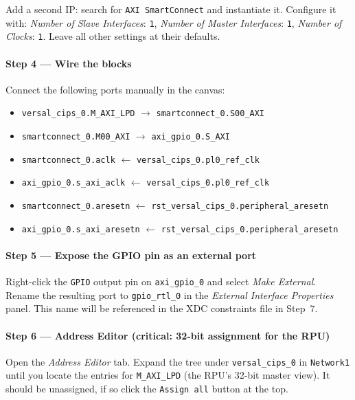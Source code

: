 \documentclass[
	a4paper,
]{CSMakotoTechnicalReport}
\begin{document}
Add a second IP: search for \texttt{AXI SmartConnect} and instantiate it.
Configure it with:
\textit{Number of Slave Interfaces}: \texttt{1},
\textit{Number of Master Interfaces}: \texttt{1},
\textit{Number of Clocks}: \texttt{1}.
Leave all other settings at their defaults.


\paragraph*{Step 4 --- Wire the blocks}

Connect the following ports manually in the canvas:

\begin{itemize}
    \item \texttt{versal\_cips\_0.M\_AXI\_LPD} $\to$ \texttt{smartconnect\_0.S00\_AXI}
    \item \texttt{smartconnect\_0.M00\_AXI} $\to$ \texttt{axi\_gpio\_0.S\_AXI}
    \item \texttt{smartconnect\_0.aclk} $\leftarrow$ \texttt{versal\_cips\_0.pl0\_ref\_clk}
    \item \texttt{axi\_gpio\_0.s\_axi\_aclk} $\leftarrow$ \texttt{versal\_cips\_0.pl0\_ref\_clk}
    \item \texttt{smartconnect\_0.aresetn} $\leftarrow$ \texttt{rst\_versal\_cips\_0.peripheral\_aresetn}
    \item \texttt{axi\_gpio\_0.s\_axi\_aresetn} $\leftarrow$ \texttt{rst\_versal\_cips\_0.peripheral\_aresetn}
\end{itemize}

\paragraph*{Step 5 --- Expose the GPIO pin as an external port}

Right-click the \texttt{GPIO} output pin on \texttt{axi\_gpio\_0} and select \textit{Make External}.
Rename the resulting port to \texttt{gpio\_rtl\_0} in the \textit{External Interface Properties} panel.
This name will be referenced in the XDC constraints file in Step~7.

\paragraph*{Step 6 --- Address Editor (critical: 32-bit assignment for the RPU)}

Open the \textit{Address Editor} tab.
Expand the tree under \texttt{versal\_cips\_0} in \texttt{Network1} until you locate the entries for \texttt{M\_AXI\_LPD} (the RPU's 32-bit master view).
It should be unassigned, if so click the \texttt{Assign all} button at the top.
\end{document}
